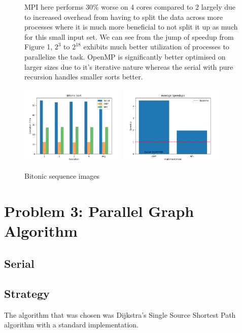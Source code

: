 \begin{figure}[htb]
    \vspace{20pt}
    
    \raggedright %
    MPI here performs 30\% worse on 4 cores compared to 2 largely due to 
	increased overhead from having to split the data across more processes where 
	it is much more beneficial to not split it up as much for this small input set. 
	We can see from the jump of speedup from Figure 1, $2^3$ to $2^{18}$ exhibits much 
	better utilization of processes to parallelize the task.
	OpenMP is significantly better optimised on larger sizes due to it's iterative
	nature whereas the serial with pure recursion handles smaller sorts better.
    
    \vspace{20pt}
    
    \includegraphics[width=0.45\textwidth]{pics/bitonic_2_26.png}
    \hfill
    \includegraphics[width=0.45\textwidth]{pics/bitonic_2_26_speedup.png}
    
    \caption{Bitonic sequence images}\label{fig:bitonic_images}
\end{figure}
\clearpage
\section{Problem 3: Parallel Graph Algorithm}
\subsection{Serial}
\subsection*{Strategy}
The algorithm that was chosen was Dijkstra's Single Source Shortest Path algorithm with a standard implementation.
